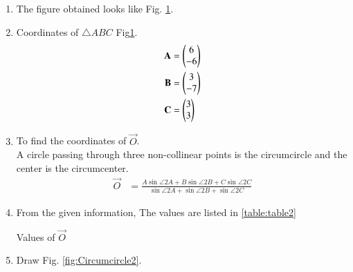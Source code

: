 \renewcommand{\theequation}{\theenumi}
\begin{enumerate}[label=\thesection.\arabic*.,ref=\thesection.\theenumi]

\begin{figure}[!ht]
\centering
\resizebox{\columnwidth}{!}{}
\caption{Circumcircle by Latex-Tikz}
\label{fig:Circumcircle}	
\end{figure}

\item The figure obtained looks like Fig. \ref{fig:Circumcircle}.\\ 

\item Coordinates of $\triangle ABC$ Fig\ref{fig:Circumcircle}. \\
\begin{align}
\mathbf{A} &=\begin{pmatrix}6\\-6\end{pmatrix} \label{eq:constr_a}\\
\mathbf{B} &=\begin{pmatrix}3\\-7\end{pmatrix} \label{eq:constr_b}\\
\mathbf{C} &=\begin{pmatrix}3\\3\end{pmatrix} \label{eq:constr_c}
\end{align}

\item To find the coordinates of $\vec{O}$. \\
\solution A circle passing through three non-collinear points is the circumcircle and the center is the circumcenter.\\
\begin{align}
\vec{O} &= \frac{A\sin{\angle 2A} + B\sin{\angle 2B} + C\sin{\angle 2C}}{\sin{\angle 2A} + \sin{\angle 2B} + \sin{\angle 2C}}
\end{align}

\item
From the given information, 
The values are listed in \ref{table:table2}\\
\begin{table}[ht!]
\centering

\caption{Values of $\vec{O}$}
\label{table:table2}	
\end{table} 

\item Draw Fig. \ref{fig:Circumcircle2}.


\end{enumerate}

